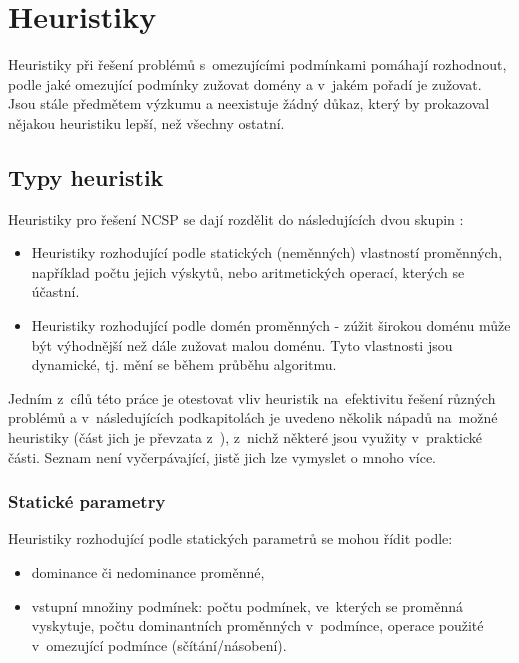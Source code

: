 \section{Heuristiky}
Heuristiky při řešení problémů s~omezujícími podmínkami pomáhají rozhodnout, podle jaké omezující podmínky zužovat domény a v~jakém pořadí je zužovat. Jsou stále předmětem výzkumu a neexistuje žádný důkaz, který by prokazoval nějakou heuristiku lepší, než všechny ostatní. 

\subsection{Typy heuristik}
Heuristiky pro řešení NCSP se dají rozdělit do následujících dvou skupin \cite{feiten10}:

\begin{itemize}
  \item Heuristiky rozhodující podle statických (neměnných) vlastností proměnných, například počtu jejich výskytů, nebo aritmetických operací, kterých se účastní.
  \item Heuristiky rozhodující podle domén proměnných - zúžit širokou doménu může být výhodnější než dále zužovat malou doménu. Tyto vlastnosti jsou dynamické, tj. mění se během průběhu algoritmu.
\end{itemize}


Jedním z~cílů této práce je otestovat vliv heuristik na~efektivitu řešení různých problémů a v~následujících podkapitolách je uvedeno několik nápadů na~možné heuristiky (část jich je převzata z~\cite{feiten10}), z~nichž některé jsou využity v~praktické části. Seznam není vyčerpávající, jistě jich lze vymyslet o mnoho více.

\subsubsection{Statické parametry}

Heuristiky rozhodující podle statických parametrů se mohou řídit podle:

\begin{itemize}
  \item dominance či nedominance proměnné,
  \item vstupní množiny podmínek:
        \subitem počtu podmínek, ve~kterých se proměnná vyskytuje,
        \subitem počtu dominantních proměnných v~podmínce,
        \subitem operace použité v~omezující podmínce (sčítání/násobení).
\end{itemize}

